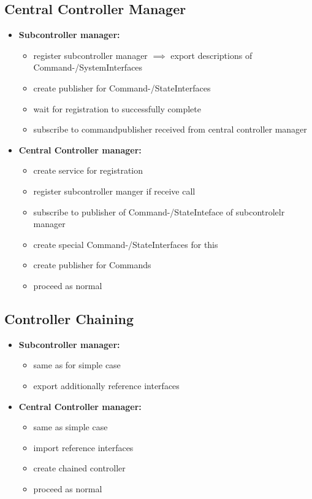 \subsection{Central Controller Manager}
\begin{itemize}
    \item \textbf{Subcontroller manager:}
    \begin{itemize}
        \item register subcontroller manager $\implies$ export descriptions of Command-/SystemInterfaces
        \item create publisher for Command-/StateInterfaces
        \item wait for registration to successfully complete
        \item subscribe to commandpublisher received from central controller manager
    \end{itemize}
    \item \textbf{Central Controller manager:}
    \begin{itemize}
        \item create service for registration
        \item register subcontroller manger if receive call
        \item subscribe to publisher of Command-/StateInteface of subcontrolelr manager
        \item create special Command-/StateInterfaces for this
        \item create publisher for Commands
        \item proceed as normal
    \end{itemize}
\end{itemize}
\subsection{Controller Chaining}
\begin{itemize}
    \item \textbf{Subcontroller manager:}
    \begin{itemize}
        \item same as for simple case
        \item export additionally reference interfaces
    \end{itemize}
    \item \textbf{Central Controller manager:}
    \begin{itemize}
        \item same as simple case
        \item import reference interfaces
        \item create chained controller
        \item proceed as normal
    \end{itemize}
\end{itemize}

